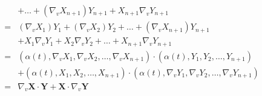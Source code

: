 \begin{enumerate}
\begin{align*}
		& + \dots + (\nabla_v X_{n+1})Y_{n+1} + X_{n+1}\nabla_v Y_{n+1}\\
		= & (\nabla_v X_1)Y_1 + (\nabla_v X_2)Y_2 + \dots + (\nabla_v X_{n+1})Y_{n+1} \\
		& + X_1\nabla_v Y_1 +X_2\nabla_v Y_2 + \dots + X_{n+1} \nabla_v Y_{n+1}\\
		= & (\alpha(t),\nabla_v X_1,\nabla_v X_2,\dots,\nabla_v X_{n+1}) \cdot (\alpha(t),Y_1,Y_2,\dots,Y_{n+1})\\
		& + (\alpha(t),X_1,X_2,\dots,X_{n+1}) \cdot (\alpha(t),\nabla_v Y_1,\nabla_v Y_2,\dots,\nabla_v Y_{n+1}) \\
		= & \nabla_v \mathbf{X} \cdot \mathbf{Y} + \mathbf{X} \cdot \nabla_v \mathbf{Y}
	\end{align*}
\end{enumerate}


